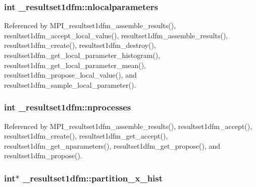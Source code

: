 \subsubsection[{\texorpdfstring{nlocalparameters}{nlocalparameters}}]{\setlength{\rightskip}{0pt plus 5cm}int \+\_\+resultset1dfm\+::nlocalparameters}\hypertarget{struct__resultset1dfm_a576efbe00bd3e77e8a80c6e275e2f72a}{}\label{struct__resultset1dfm_a576efbe00bd3e77e8a80c6e275e2f72a}


Referenced by M\+P\+I\+\_\+resultset1dfm\+\_\+assemble\+\_\+results(), resultset1dfm\+\_\+accept\+\_\+local\+\_\+value(), resultset1dfm\+\_\+assemble\+\_\+results(), resultset1dfm\+\_\+create(), resultset1dfm\+\_\+destroy(), resultset1dfm\+\_\+get\+\_\+local\+\_\+parameter\+\_\+histogram(), resultset1dfm\+\_\+get\+\_\+local\+\_\+parameter\+\_\+mean(), resultset1dfm\+\_\+propose\+\_\+local\+\_\+value(), and resultset1dfm\+\_\+sample\+\_\+local\+\_\+parameter().

\subsubsection[{\texorpdfstring{nprocesses}{nprocesses}}]{\setlength{\rightskip}{0pt plus 5cm}int \+\_\+resultset1dfm\+::nprocesses}\hypertarget{struct__resultset1dfm_a881dce3156e105e5a37de87f25a6b6ab}{}\label{struct__resultset1dfm_a881dce3156e105e5a37de87f25a6b6ab}


Referenced by M\+P\+I\+\_\+resultset1dfm\+\_\+assemble\+\_\+results(), resultset1dfm\+\_\+accept(), resultset1dfm\+\_\+create(), resultset1dfm\+\_\+get\+\_\+accept(), resultset1dfm\+\_\+get\+\_\+nparameters(), resultset1dfm\+\_\+get\+\_\+propose(), and resultset1dfm\+\_\+propose().

\subsubsection[{\texorpdfstring{partition\+\_\+x\+\_\+hist}{partition_x_hist}}]{\setlength{\rightskip}{0pt plus 5cm}int$\ast$ \+\_\+resultset1dfm\+::partition\+\_\+x\+\_\+hist}\hypertarget{struct__resultset1dfm_aff0d258369cc09d605b366d220bff236}{}\label{struct__resultset1dfm_aff0d258369cc09d605b366d220bff236}


